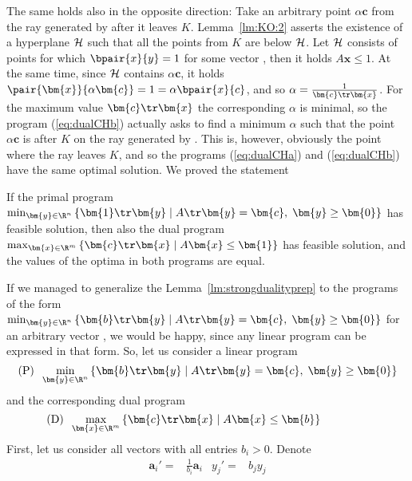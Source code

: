 \vspace*{-4ex}
\noindent
The same holds also in the opposite direction: Take an arbitrary point $\alpha\bm{c}$ from the ray generated by 
after it leaves $K$. Lemma~\ref{lm:KO:2}
asserts the existence of a hyperplane $\cal H$ such that all the points from $K$ are below $\cal H$. Let $\cal H$
consists of points  for which $\bpair{x}{y}=1$ for some vector , then it holds
$A\bm{x}\le1$.
At the same time, since $\cal H$ contains $\alpha\bm{c}$, it holds $\pair{\bm{x}}{\alpha\bm{c}}=1=\alpha\bpair{x}{c}$,
and so $\alpha=\frac{1}{\bm{c}\tr\bm{x}}$.
For the maximum value $\bm{c}\tr\bm{x}$ the corresponding $\alpha$ is minimal, so the program
 (\ref{eq:dualCHb})
 actually asks to find a minimum $\alpha$ such that the point $\alpha\bm{c}$ is after $K$ on the ray generated by 
. This is, however, obviously the point where the ray leaves $K$, and so the programs 
(\ref{eq:dualCHa}) and (\ref{eq:dualCHb}) have the same optimal solution.
We proved the statement

\begin{lema}
  \label{lm:strongdualityprep}
  If the primal program $\min_{\bm{y}\in\R^n}\left\{ \bm{1}\tr\bm{y} \mid A\tr\bm{y}=\bm{c},\;\bm{y}\ge\bm{0}\right\}$
  has feasible solution, then also the dual program
$\max_{\bm{x}\in\R^m}\left\{ \bm{c}\tr\bm{x} \mid A\bm{x}\le\bm{1}\right\}$
has feasible solution, and the values of the optima in both programs are equal.
\end{lema}

\noindent
If we managed to generalize the Lemma~\ref{lm:strongdualityprep}
to the programs of the form
$\min_{\bm{y}\in\R^n}\left\{ \bm{b}\tr\bm{y} \mid A\tr\bm{y}=\bm{c},\;\bm{y}\ge\bm{0}\right\}$
for an arbitrary vector  ,
we would be happy, since any linear program can be expressed in that form. 
So, let us consider a linear program
\begin{equation}
  \label{eq:dualgenP}
  \text{(P)}\;\; \min_{\bm{y}\in\R^n}\left\{ \bm{b}\tr\bm{y} \mid A\tr\bm{y}=\bm{c},\;\bm{y}\ge\bm{0}\right\}
\end{equation}
and the corresponding dual program
\begin{equation}
  \label{eq:dualgenD}
  \text{(D)}\;\;\max_{\bm{x}\in\R^m}\left\{ \bm{c}\tr\bm{x} \mid A\bm{x}\le\bm{b}\right\}\hspace*{10ex}
\end{equation}
\noindent
First, let us consider all vectors  with all entries $b_i>0$. Denote
\begin{align}
  \label{eq:dualgenNote1}
  \bm{a}_i'=&\frac{1}{b_i}\bm{a}_i & y_j'=&b_jy_j 
\end{align}

